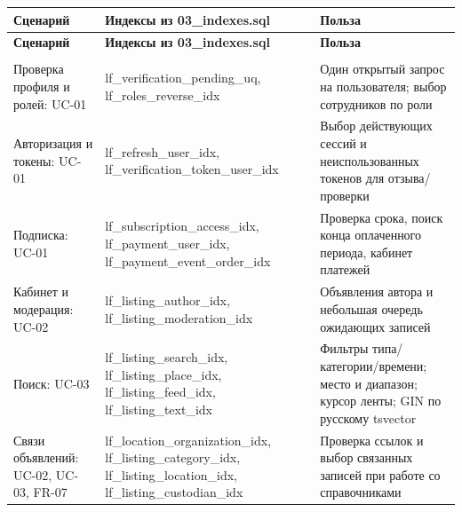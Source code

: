 \begin{longtable}{|>{\RaggedRight\arraybackslash}p{0.30\tablecontentwidth}|>{\RaggedRight\arraybackslash}p{0.35\tablecontentwidth}|>{\RaggedRight\arraybackslash}p{0.35\tablecontentwidth}|}
\hline
\textbf{Сценарий} & \textbf{Индексы из 03\_\allowbreak{}indexes.sql} & \textbf{Польза} \\ \hline
\endfirsthead
\textbf{Сценарий} & \textbf{Индексы из 03\_\allowbreak{}indexes.sql} & \textbf{Польза} \\ \hline
\endhead
\multicolumn{3}{r}{\footnotesize Продолжение на следующей странице} \\
\endfoot
\endlastfoot
Проверка профиля и ролей: UC-01 & lf\_\allowbreak{}verification\_\allowbreak{}pending\_\allowbreak{}uq, lf\_\allowbreak{}roles\_\allowbreak{}reverse\_\allowbreak{}idx & Один открытый запрос на пользователя; выбор сотрудников по роли \\ \hline
Авторизация и токены: UC-01 & lf\_\allowbreak{}refresh\_\allowbreak{}user\_\allowbreak{}idx, lf\_\allowbreak{}verification\_\allowbreak{}token\_\allowbreak{}user\_\allowbreak{}idx & Выбор действующих сессий и неиспользованных токенов для отзыва/\allowbreak{}проверки \\ \hline
Подписка: UC-01 & lf\_\allowbreak{}subscription\_\allowbreak{}access\_\allowbreak{}idx, lf\_\allowbreak{}payment\_\allowbreak{}user\_\allowbreak{}idx, lf\_\allowbreak{}payment\_\allowbreak{}event\_\allowbreak{}order\_\allowbreak{}idx & Проверка срока, поиск конца оплаченного периода, кабинет платежей \\ \hline
Кабинет и модерация: UC-02 & lf\_\allowbreak{}listing\_\allowbreak{}author\_\allowbreak{}idx, lf\_\allowbreak{}listing\_\allowbreak{}moderation\_\allowbreak{}idx & Объявления автора и небольшая очередь ожидающих записей \\ \hline
Поиск: UC-03 & lf\_\allowbreak{}listing\_\allowbreak{}search\_\allowbreak{}idx, lf\_\allowbreak{}listing\_\allowbreak{}place\_\allowbreak{}idx, lf\_\allowbreak{}listing\_\allowbreak{}feed\_\allowbreak{}idx, lf\_\allowbreak{}listing\_\allowbreak{}text\_\allowbreak{}idx & Фильтры типа/\allowbreak{}категории/\allowbreak{}времени; место и диапазон; курсор ленты; GIN по русскому tsvector \\ \hline
Связи объявлений: UC-02, UC-03, FR-07 & lf\_\allowbreak{}location\_\allowbreak{}organization\_\allowbreak{}idx, lf\_\allowbreak{}listing\_\allowbreak{}category\_\allowbreak{}idx, lf\_\allowbreak{}listing\_\allowbreak{}location\_\allowbreak{}idx, lf\_\allowbreak{}listing\_\allowbreak{}custodian\_\allowbreak{}idx & Проверка ссылок и выбор связанных записей при работе со справочниками \\ \hline

\end{longtable}
